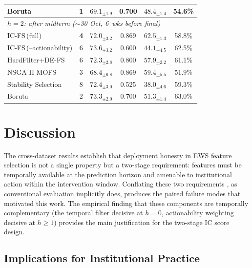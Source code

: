 \documentclass[a4paper,fleqn]{cas-sc}
\begin{document}
\begin{table}[t]
\begin{tabular}{lc ccc c}
    Boruta                   & 1          & $69.1_{\pm 1.9}$ & 0.700 & $48.4_{\pm 1.4}$          & 54.6\% \\
    \midrule
    \multicolumn{6}{l}{\textit{$h=2$: after midterm (${\sim}$30 Oct, 6~wks before final)}} \\[2pt]
    IC-FS\,(full)            & \textbf{4} & $72.0_{\pm 3.2}$ & 0.869 & \textbf{$62.5_{\pm 1.3}$} & 58.8\% \\
    IC-FS\,(--actionability) & 6          & $73.6_{\pm 3.2}$ & 0.600 & $44.1_{\pm 4.5}$          & 62.5\% \\
    HardFilter+DE-FS         & 6          & $72.3_{\pm 2.8}$ & 0.800 & $57.9_{\pm 2.2}$          & 61.1\% \\
    NSGA-II-MOFS             & 3          & $68.4_{\pm 6.8}$ & 0.869 & $59.4_{\pm 5.5}$          & 51.9\% \\
    Stability Selection      & 8          & $72.4_{\pm 3.0}$ & 0.525 & $38.0_{\pm 4.6}$          & 59.3\% \\
    Boruta                   & 2          & $73.3_{\pm 2.0}$ & 0.700 & $51.3_{\pm 1.4}$          & 63.0\% \\
    \bottomrule
  \end{tabular}
\end{table}

\section{Discussion}
\label{sec:discussion}

The cross-dataset results establish that deployment honesty in EWS feature selection is not a single property but a two-stage requirement: features must be temporally available at the prediction horizon and amenable to institutional action within the intervention window. Conflating these two requirements , as conventional evaluation implicitly does, produces the paired failure modes that motivated this work. The empirical finding that these components are temporally complementary (the temporal filter decisive at $h=0$, actionability weighting decisive at $h \geq 1$) provides the main justification for the two-stage IC score design.

\subsection{Implications for Institutional Practice}
\label{sec:discussion:implications}
\end{document}
